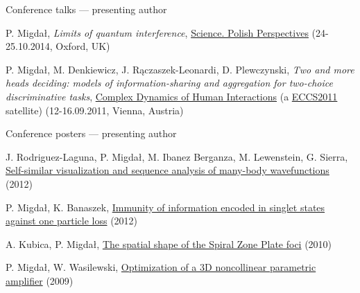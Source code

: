 \documentclass[margin,line]{resume}
\begin{document}
\begin{resume}
    Conference talks --- presenting author
     \begin{list2}
        \item P. Migdał, {\sl Limits of quantum interference}, \href{http://www.polishperspectives.org/}{Science. Polish Perspectives} (24-25.10.2014, Oxford, UK)
        \item P. Migdał, M. Denkiewicz, J. Rączaszek-Leonardi, D. Plewczynski, {\sl Two and more heads deciding: models of information-sharing and aggregation for two-choice discriminative tasks}, \href{http://markov.uc3m.es/complexdynamics11/Home.html}{Complex Dynamics of Human Interactions} (a \href{http://www.eccs2011.eu/}{ECCS2011} satellite) (12-16.09.2011, Vienna, Austria)
    \end{list2}   

    Conference posters --- presenting author
    \begin{list2}
        \item J. Rodriguez-Laguna, P. Migdał, M. Ibanez Berganza, M. Lewenstein, G. Sierra, \href{http://dx.doi.org/10.6084/m9.figshare.97233}{Self-similar visualization and sequence analysis of many-body wavefunctions} (2012)
        \item P. Migdał, K. Banaszek, \href{http://dx.doi.org/10.6084/m9.figshare.97235}{Immunity of information encoded in singlet states against one particle loss} (2012)
        \item A. Kubica, P. Migdał, \href{http://dx.doi.org/10.6084/m9.figshare.97236}{The spatial shape of the Spiral Zone Plate foci} (2010)
        \item P. Migdał, W. Wasilewski, \href{http://dx.doi.org/10.6084/m9.figshare.97237}{Optimization of a 3D noncollinear parametric amplifier} (2009)
    \end{list2}
    

\end{resume}
\end{document}
